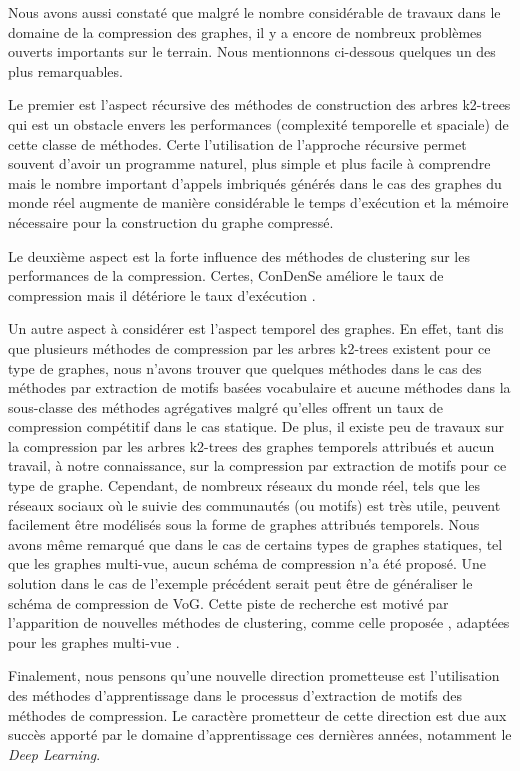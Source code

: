 				
				
								
								Nous avons aussi constaté que malgré le nombre considérable de travaux dans
le domaine de la compression des graphes, il y a encore
de nombreux problèmes ouverts importants sur le terrain. Nous mentionnons ci-dessous quelques un des plus remarquables.
 

Le premier est l'aspect récursive des méthodes de construction des arbres k2-trees qui est un obstacle envers les performances (complexité temporelle et spaciale) de cette classe de méthodes. Certe l'utilisation de l'approche récursive permet souvent d'avoir un programme naturel, plus simple et plus facile à comprendre mais le nombre important d'appels imbriqués générés dans le cas des graphes du monde réel augmente de manière considérable le temps d'exécution et la mémoire nécessaire pour la construction du graphe compressé. 

Le deuxième aspect est la forte influence des méthodes de clustering sur les performances de la compression. Certes, \gls{ConDenSe} améliore le taux de compression mais il détériore le taux d'exécution \citep{liu2018reducing}.

Un autre aspect à considérer est l'aspect temporel des graphes. En effet, tant dis que plusieurs méthodes de compression par les arbres k2-trees existent pour ce type de graphes, nous n'avons trouver que quelques méthodes dans le cas des méthodes par extraction de motifs basées vocabulaire et aucune méthodes dans la sous-classe des méthodes agrégatives malgré qu'elles offrent un taux de compression compétitif dans le cas statique. De plus, il existe peu de travaux sur la compression par les arbres k2-trees des graphes temporels attribués et aucun travail, à notre connaissance, sur la compression par extraction de motifs pour ce type de graphe. Cependant, de nombreux réseaux du monde réel, tels que les réseaux sociaux où le suivie des communautés (ou motifs) est très utile, peuvent facilement être modélisés sous la forme de graphes attribués temporels. Nous avons même remarqué que dans le cas de certains types de graphes statiques, tel que les graphes multi-vue, aucun schéma de compression n'a été proposé. Une solution dans le cas de l'exemple précédent serait peut être de généraliser le schéma de compression de VoG. Cette piste de recherche est motivé par l'apparition de nouvelles méthodes de clustering, comme celle proposée \citep{wang2019study}, adaptées pour les graphes multi-vue .


Finalement, nous pensons qu'une nouvelle direction prometteuse est l'utilisation des méthodes d'apprentissage dans le processus d'extraction de motifs des méthodes de compression. Le caractère prometteur de cette direction est due aux succès apporté par le domaine d'apprentissage ces dernières années, notamment le \textit{Deep Learning}. %
								

